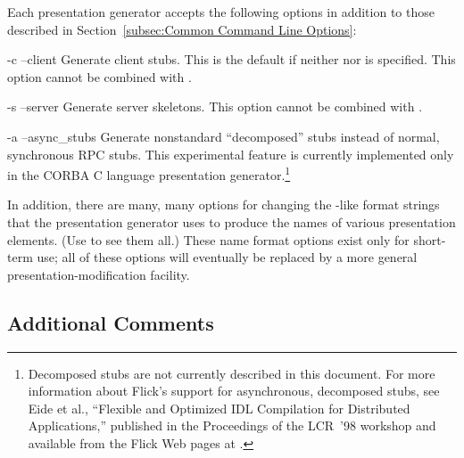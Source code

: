 Each presentation generator accepts the following options in addition to those
described in Section~\ref{subsec:Common Command Line Options}:

\begin{optionlist}
  \item[-c \oroption{} --client] Generate client stubs.  This is the default if
  neither  nor  is specified.  This option cannot be
  combined with .

  \item[-s \oroption{} --server] Generate server skeletons.  This option cannot
  be combined with .

  \item[-a \oroption{} --async_stubs] Generate nonstandard ``decomposed'' stubs
  instead of normal, synchronous RPC stubs.  This experimental feature is
  currently implemented only in the CORBA C language presentation
  generator.\footnote{Decomposed stubs are not currently described in this
  document.  For more information about Flick's support for asynchronous,
  decomposed stubs, see Eide et al., ``Flexible and Optimized IDL Compilation
  for Distributed Applications,'' published in the Proceedings of the LCR~'98
  workshop and available from the Flick Web pages at \flickurl{}.}



\end{optionlist}

In addition, there are many, many options for changing the
-like format strings that the presentation generator uses to
produce the names of various presentation elements.  (Use  to
see them all.)  These name format options exist only for short-term use; all of
these options will eventually be replaced by a more general
presentation-modification facility.



\subsection{Additional Comments}
\label{subsec:PG:Additional Comments}

